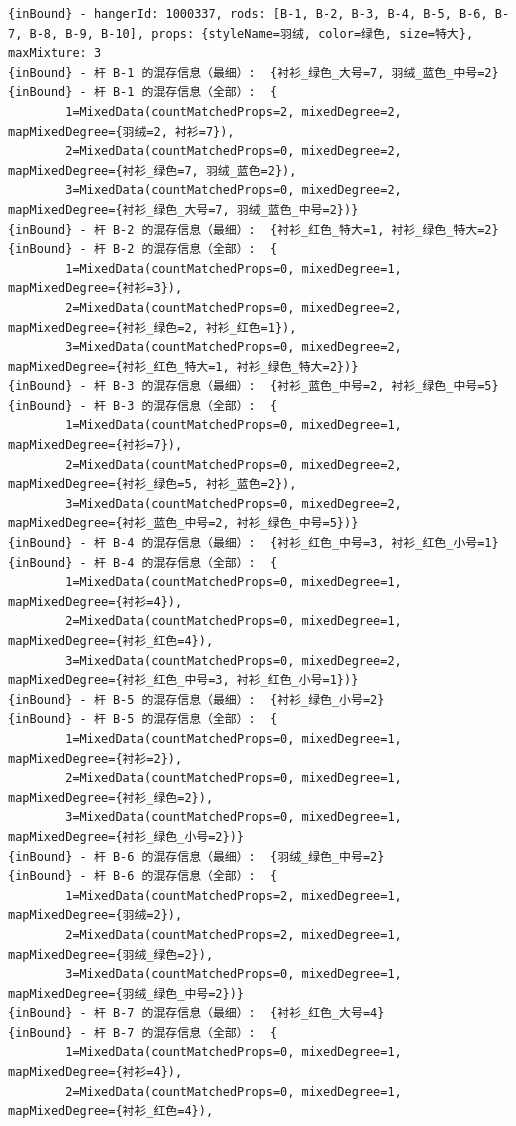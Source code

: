 {\begin{verbatim}
{inBound} - hangerId: 1000337, rods: [B-1, B-2, B-3, B-4, B-5, B-6, B-7, B-8, B-9, B-10], props: {styleName=羽绒, color=绿色, size=特大}, maxMixture: 3
{inBound} - 杆 B-1 的混存信息（最细）:  {衬衫_绿色_大号=7, 羽绒_蓝色_中号=2}
{inBound} - 杆 B-1 的混存信息（全部）:  {
		1=MixedData(countMatchedProps=2, mixedDegree=2, mapMixedDegree={羽绒=2, 衬衫=7}), 
		2=MixedData(countMatchedProps=0, mixedDegree=2, mapMixedDegree={衬衫_绿色=7, 羽绒_蓝色=2}), 
		3=MixedData(countMatchedProps=0, mixedDegree=2, mapMixedDegree={衬衫_绿色_大号=7, 羽绒_蓝色_中号=2})}
{inBound} - 杆 B-2 的混存信息（最细）:  {衬衫_红色_特大=1, 衬衫_绿色_特大=2}
{inBound} - 杆 B-2 的混存信息（全部）:  {
		1=MixedData(countMatchedProps=0, mixedDegree=1, mapMixedDegree={衬衫=3}), 
		2=MixedData(countMatchedProps=0, mixedDegree=2, mapMixedDegree={衬衫_绿色=2, 衬衫_红色=1}), 
		3=MixedData(countMatchedProps=0, mixedDegree=2, mapMixedDegree={衬衫_红色_特大=1, 衬衫_绿色_特大=2})}
{inBound} - 杆 B-3 的混存信息（最细）:  {衬衫_蓝色_中号=2, 衬衫_绿色_中号=5}
{inBound} - 杆 B-3 的混存信息（全部）:  {
		1=MixedData(countMatchedProps=0, mixedDegree=1, mapMixedDegree={衬衫=7}), 
		2=MixedData(countMatchedProps=0, mixedDegree=2, mapMixedDegree={衬衫_绿色=5, 衬衫_蓝色=2}), 
		3=MixedData(countMatchedProps=0, mixedDegree=2, mapMixedDegree={衬衫_蓝色_中号=2, 衬衫_绿色_中号=5})}
{inBound} - 杆 B-4 的混存信息（最细）:  {衬衫_红色_中号=3, 衬衫_红色_小号=1}
{inBound} - 杆 B-4 的混存信息（全部）:  {
		1=MixedData(countMatchedProps=0, mixedDegree=1, mapMixedDegree={衬衫=4}), 
		2=MixedData(countMatchedProps=0, mixedDegree=1, mapMixedDegree={衬衫_红色=4}), 
		3=MixedData(countMatchedProps=0, mixedDegree=2, mapMixedDegree={衬衫_红色_中号=3, 衬衫_红色_小号=1})}
{inBound} - 杆 B-5 的混存信息（最细）:  {衬衫_绿色_小号=2}
{inBound} - 杆 B-5 的混存信息（全部）:  {
		1=MixedData(countMatchedProps=0, mixedDegree=1, mapMixedDegree={衬衫=2}), 
		2=MixedData(countMatchedProps=0, mixedDegree=1, mapMixedDegree={衬衫_绿色=2}), 
		3=MixedData(countMatchedProps=0, mixedDegree=1, mapMixedDegree={衬衫_绿色_小号=2})}
{inBound} - 杆 B-6 的混存信息（最细）:  {羽绒_绿色_中号=2}
{inBound} - 杆 B-6 的混存信息（全部）:  {
		1=MixedData(countMatchedProps=2, mixedDegree=1, mapMixedDegree={羽绒=2}), 
		2=MixedData(countMatchedProps=2, mixedDegree=1, mapMixedDegree={羽绒_绿色=2}), 
		3=MixedData(countMatchedProps=0, mixedDegree=1, mapMixedDegree={羽绒_绿色_中号=2})}
{inBound} - 杆 B-7 的混存信息（最细）:  {衬衫_红色_大号=4}
{inBound} - 杆 B-7 的混存信息（全部）:  {
		1=MixedData(countMatchedProps=0, mixedDegree=1, mapMixedDegree={衬衫=4}), 
		2=MixedData(countMatchedProps=0, mixedDegree=1, mapMixedDegree={衬衫_红色=4}), 

\end{verbatim}}
